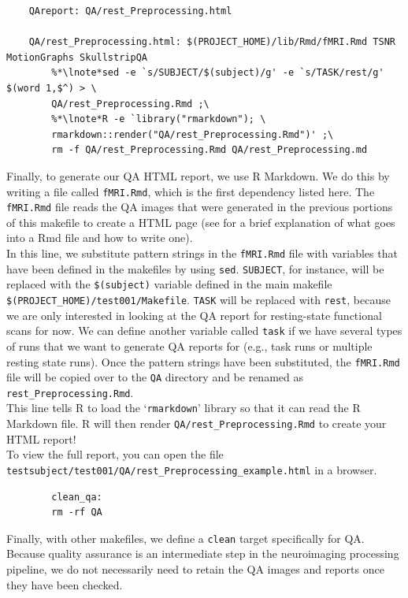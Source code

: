 \begin{lstlisting}
	QAreport: QA/rest_Preprocessing.html 

	QA/rest_Preprocessing.html: $(PROJECT_HOME)/lib/Rmd/fMRI.Rmd TSNR MotionGraphs SkullstripQA
		%*\lnote*sed -e `s/SUBJECT/$(subject)/g' -e `s/TASK/rest/g' $(word 1,$^) > \
		QA/rest_Preprocessing.Rmd ;\
		%*\lnote*R -e `library("rmarkdown"); \
		rmarkdown::render("QA/rest_Preprocessing.Rmd")' ;\
		rm -f QA/rest_Preprocessing.Rmd QA/rest_Preprocessing.md
\end{lstlisting}


Finally, to generate our QA HTML report, we use R Markdown. We do this by writing a file called \texttt{fMRI.Rmd}, which is the first dependency listed here. The \texttt{fMRI.Rmd} file reads the QA images that were generated in the previous portions of this makefile to create a HTML page (see  for a brief explanation of what goes into a Rmd file and how to write one). \\
 In this line, we substitute pattern strings in the \texttt{fMRI.Rmd} file with variables that have been defined in the makefiles by using \texttt{sed}. \texttt{SUBJECT}, for instance, will be replaced with the \texttt{\$(subject)} variable defined in the main makefile \texttt{\$(PROJECT\_HOME)/test001/Makefile}. \texttt{TASK} will be replaced with \texttt{rest}, because we are only interested in looking at the QA report for resting-state functional scans for now. We can define another variable called \texttt{task} if we have several types of runs that we want to generate QA reports for (e.g., task runs or multiple resting state runs). Once the pattern strings have been substituted, the \texttt{fMRI.Rmd} file will be copied over to the \texttt{QA} directory and be renamed as \texttt{rest\_Preprocessing.Rmd}. \\
\lnum{13} This line tells R to load the `\texttt{rmarkdown}' library so that it can read the R Markdown file. R will then render \texttt{QA/rest\_Preprocessing.Rmd} to create your HTML report! \\

To view the full report, you can open the file \texttt{testsubject/test001/QA/rest_Preprocessing_example.html} in a browser.


\begin{lstlisting}
		clean_qa: 
		rm -rf QA
\end{lstlisting}

Finally, with other makefiles, we define a \texttt{clean} target specifically for QA. Because quality assurance is an intermediate step in the neuroimaging processing pipeline, we do not necessarily need to retain the QA images and reports once they have been checked.


